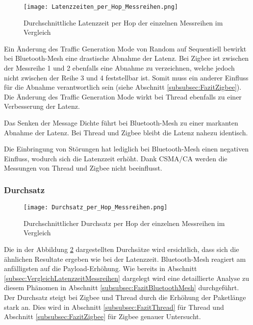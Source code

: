 \begin{figure}[H]
	\centering
	\texttt{[image: Latenzzeiten\_per\_Hop\_Messreihen.png]}
	\caption{Durchschnittliche Latenzzeit per Hop der einzelnen Messreihen im Vergleich}\label{fig:Latenzzeiten_per_Hop_Messreihen}
\end{figure}

Ein Änderung des Traffic Generation Mode von Random auf Sequentiell bewirkt bei Bluetooth-Mesh eine drastische Abnahme der Latenz. Bei Zigbee ist zwischen der Messreihe 1 und 2 ebenfalls eine Abnahme zu verzeichnen, welche jedoch nicht zwischen der Reihe 3 und 4 feststellbar ist. Somit muss ein anderer Einfluss für die Abnahme verantwortlich sein (siehe Abschnitt \ref{subsubsec:FazitZigbee}). Die Änderung des Traffic Generation Mode wirkt bei Thread ebenfalls zu einer Verbesserung der Latenz.

Das Senken der Message Dichte führt bei Bluetooth-Mesh zu einer markanten Abnahme der Latenz. Bei Thread und Zigbee bleibt die Latenz nahezu identisch.
 
Die Einbringung von Störungen hat lediglich bei Bluetooth-Mesh einen negativen Einfluss, wodurch sich die Latenzzeit erhöht.
Dank CSMA\slash CA werden die Messungen von Thread und Zigbee nicht beeinflusst.

\subsubsection{Durchsatz}\label{subsec:VergleichDurchsatzMessreihen}


\begin{figure}[H]
	\centering
	\texttt{[image: Durchsatz\_per\_Hop\_Messreihen.png]}
	\caption{Durchschnittlicher Durchsatz per Hop der einzelnen Messreihen im Vergleich}\label{fig:Durchsätze_per_Hop_Messreihen}
\end{figure}


Die in der Abbildung \ref{fig:Durchsätze_per_Hop_Messreihen} dargestellten Durchsätze wird ersichtlich, dass sich die ähnlichen Resultate ergeben wie bei der Latenzzeit. Bluetooth-Mesh reagiert am anfälligsten auf die Payload-Erhöhung. Wie bereits in Abschnitt \ref{subsec:VergleichLatenzzeitMessreihen} dargelegt wird eine detaillierte Analyse zu diesem Phänomen in Abschnitt \ref{subsubsec:FazitBluetoothMesh} durchgeführt. Der Durchsatz steigt bei Zigbee und Thread durch die Erhöhung der Paketlänge stark an. Dies wird in Abschnitt \ref{subsubsec:FazitThread} für Thread und Abschnitt \ref{subsubsec:FazitZigbee} für Zigbee genauer Untersucht.

